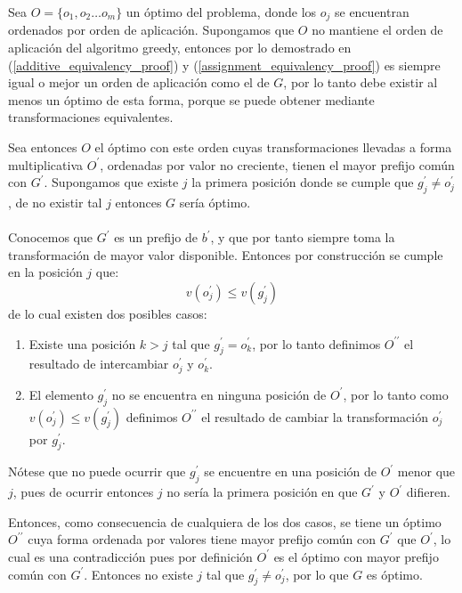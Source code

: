 \documentclass{article}
\theoremstyle{default}
\begin{document}
	Sea $O = \{o_1, o_2 \dots o_m\}$ un óptimo del problema, donde los $o_j$ se encuentran ordenados por orden de aplicación. Supongamos que $O$ no mantiene el orden de aplicación del algoritmo greedy, entonces por lo demostrado en (\ref{additive_equivalency_proof}) y (\ref{assignment_equivalency_proof}) es siempre igual o mejor un orden de aplicación como el de $G$, por lo tanto debe existir al menos un óptimo de esta forma, porque se puede obtener mediante transformaciones equivalentes.

	Sea entonces $O$ el óptimo con este orden cuyas transformaciones llevadas a forma multiplicativa $O^\prime$, ordenadas por valor no creciente, tienen el mayor prefijo común con $G^\prime$. Supongamos que existe $j$ la primera posición donde se cumple que $g_j^\prime \neq o_j^\prime$, de no existir tal $j$ entonces $G$ sería óptimo.

\paragraph{}
	Conocemos que $G^\prime$ es un prefijo de $b^{\prime}$, y que por tanto siempre toma la transformación de mayor valor disponible. Entonces por construcción se cumple en la posición $j$ que:
%
	\begin{equation*}
		v(o_j^\prime) \leq v(g_j^\prime)
	\end{equation*}
%
	de lo cual existen dos posibles casos:
%
	\begin{enumerate}
		\item Existe una posición $k > j$ tal que $g_j^\prime = o_k^\prime$, por lo tanto definimos $O^{\prime\prime}$ el resultado de intercambiar $o_j^\prime$ y $o_k^\prime$.
		
		\item El elemento $g_j^\prime$ no se encuentra en ninguna posición de $O^\prime$, por lo tanto como $v(o_j^\prime) \leq v(g_j^\prime)$ definimos $O^{\prime\prime}$ el resultado de cambiar la transformación $o_j^\prime$ por $g_j^\prime$.
	\end{enumerate}
%
	Nótese que no puede ocurrir que $g_j^\prime$ se encuentre en una posición de $O^\prime$ menor que $j$, pues de ocurrir entonces $j$ no sería la primera posición en que $G^\prime$ y $O^\prime$ difieren.

	Entonces, como consecuencia de cualquiera de los dos casos, se tiene un óptimo $O^{\prime\prime}$ cuya forma ordenada por valores tiene mayor prefijo común con $G^\prime$ que $O^\prime$, lo cual es una contradicción pues por definición $O^\prime$ es el óptimo con mayor prefijo común con $G^\prime$. Entonces no existe $j$ tal que $g_j^\prime \neq o_j^\prime$, por lo que $G$ es óptimo.
%
%
%
\end{document}
